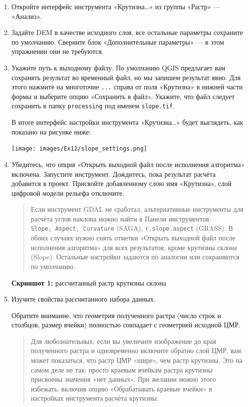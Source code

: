 \documentclass[
  12pt,
]{book}
\begin{document}
\begin{enumerate}
\def\labelenumi{\arabic{enumi}.}
\setcounter{enumi}{2}
\item
  Откройте интерфейс инструмента «Крутизна\ldots» из группы «Растр» --- «Анализ».
\item
  Задайте DEM в качестве исходного слоя, все остальные параметры сохраните по умолчанию. Сверните блок «Дополнительные параметры» --- в этом упражнении они не требуются.
\item
  Укажите путь к выходному файлу. По умолчанию QGIS предлагает вам сохранять результат во временный файл, но мы запишем результат явно. Для этого нажмите на многоточие \texttt{...} справа от поля «Крутизна» в нижней части формы и выберите опцию «Сохранить в файл». Укажите, что файл следует сохранить в папку \texttt{processing} под именем \texttt{slope.tif}.

  В итоге интерфейс настройки инструмента «Крутизна\ldots» будет выглядеть, как показано на рисунке ниже:

  \texttt{[image: images/Ex12/slope\_settings.png]}
\item
  Убедитесь, что опция «Открыть выходной файл после исполнения алгоритма» включена. Запустите инструмент. Дождитесь, пока результат расчёта добавится в проект. Присвойте добавленному слою имя «Крутизна», слой цифровой модели рельефа отключите.

  \begin{quote}
  Если инструмент GDAL не сработал, альтернативные инструменты для расчёта углов наклона можно найти в Панели инструментов: \texttt{Slope,\ Aspect,\ Curvature} (SAGA), \texttt{r.slope.aspect} (GRASS). В обоих случаях нужно снять отметки «Открыть выходной файл после исполнения алгоритма» для всех результатов, кроме крутизны склона (Slope). Остальные настройки задаются по аналогии или сохраняются по умолчанию.
  \end{quote}

  \textbf{Скриншот 1:} рассчитанный растр крутизны склона
\item
  Изучите свойства рассчитанного набора данных.

  Обратите внимание, что геометрия полученного растра (число строк и столбцов, размер ячейки) полностью совпадает с геометрией исходной ЦМР.

  \begin{quote}
  Для любознательных: если вы увеличите изображение до края полученного растра и одновременно включите обратно слой ЦМР, вам может показаться, что растр ЦМР «шире», чем растр крутизны. Это на самом деле не так: просто краевым ячейкам растра крутизны присвоены значения «нет данных». При желании можно этого избежать, включив опцию «Обрабатывать краевые ячейки» в настройках инструмента расчёта крутизны.
  \end{quote}


\end{enumerate}
\end{document}
